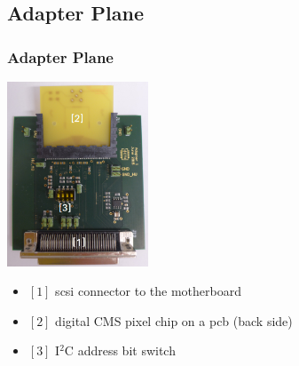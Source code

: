 \documentclass[9pt]{beamer}
\begin{document}
\subsection{Adapter Plane}
\begin{frame}
	\frametitle{Adapter Plane}
	\begin{center}
		\begin{minipage}{4.5cm}
			\centering
			\includegraphics[width=4.2cm]{Pics/digada}
		\end{minipage}
		\hspace*{2pt}
		\begin{minipage}{6cm}
			\begin{itemize}
				\item $[1]$ scsi connector to the motherboard
				\item $[2]$ digital CMS pixel chip on a pcb (back side)
				\item $[3]$ I$^{2}$C address bit switch
			\end{itemize}
		\end{minipage}\no\s
	\end{center}
\end{frame}
\end{document}
